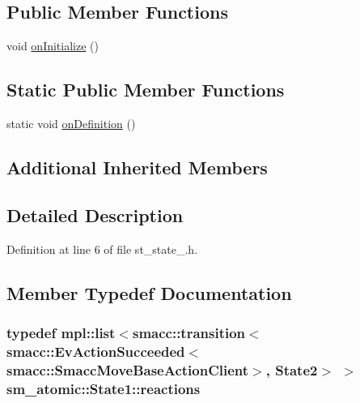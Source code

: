 \subsection*{Public Member Functions}
\begin{DoxyCompactItemize}
\item 
void \hyperlink{structsm__atomic_1_1State1_a13084492414b7b478f9f4b78a749c020}{on\+Initialize} ()
\end{DoxyCompactItemize}
\subsection*{Static Public Member Functions}
\begin{DoxyCompactItemize}
\item 
static void \hyperlink{structsm__atomic_1_1State1_ad422837dc6136634e7fc8253658ec612}{on\+Definition} ()
\end{DoxyCompactItemize}
\subsection*{Additional Inherited Members}


\subsection{Detailed Description}


Definition at line 6 of file st\+\_\+state\+\_.\+h.



\subsection{Member Typedef Documentation}
\subsubsection[{\texorpdfstring{reactions}{reactions}}]{\setlength{\rightskip}{0pt plus 5cm}typedef mpl\+::list$<${\bf smacc\+::transition}$<${\bf smacc\+::\+Ev\+Action\+Succeeded}$<${\bf smacc\+::\+Smacc\+Move\+Base\+Action\+Client}$>$, {\bf State2}$>$ $>$ {\bf sm\+\_\+atomic\+::\+State1\+::reactions}}\hypertarget{structsm__atomic_1_1State1_a4e99eb2cb5d658e8a174a51ce76a09c2}{}\label{structsm__atomic_1_1State1_a4e99eb2cb5d658e8a174a51ce76a09c2}


